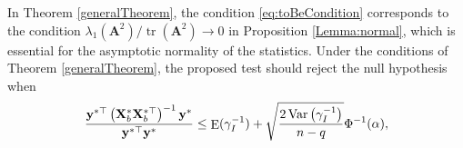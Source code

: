 \documentclass[smallextended]{svjour3}       %
\DeclareMathOperator{\mytr}{tr}
\DeclareMathOperator{\myE}{E}
\DeclareMathOperator{\myVar}{Var}
\DeclareMathOperator{\myCov}{Cov}
\newcommand{\By}{\mathbf{y}}    \newcommand{\Bz}{\mathbf{z}}
\newcommand{\BA}{\mathbf{A}}    \newcommand{\BB}{\mathbf{B}}    \newcommand{\BC}{\mathbf{C}}    \newcommand{\BD}{\mathbf{D}}    \newcommand{\BE}{\mathbf{E}}    \newcommand{\BF}{\mathbf{F}}    \newcommand{\BG}{\mathbf{G}}    \newcommand{\BH}{\mathbf{H}}    \newcommand{\BI}{\mathbf{I}}    \newcommand{\BJ}{\mathbf{J}}    \newcommand{\BK}{\mathbf{K}}    \newcommand{\BL}{\mathbf{L}}
\begin{document}
\begin{theorem}

\end{theorem}
In Theorem \ref{generalTheorem}, the condition \eqref{eq:toBeCondition} corresponds to the condition $\lambda_1(\BA^2)/ \mytr(\BA^2) \to 0$ in Proposition \ref{Lemma:normal}, which is essential for the asymptotic normality of the statistics.
Under the conditions of Theorem \ref{generalTheorem}, the proposed test should reject the null hypothesis when
\begin{equation*}
        \frac{
            \By^{*\top} \left( \BX_b^* \BX_b^{*\top} \right)^{-1} \By^*
        }{
            \By^{*\top} \By^*
        } 
        \leq 
        \myE (\gamma_I^{-1})
        +\sqrt{
            \frac{2\myVar\left( \gamma_I^{-1} \right)}{n-q} 
        }
        \Phi^{-1}(\alpha),
\end{equation*}
\end{document}

